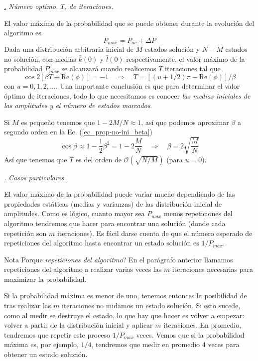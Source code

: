 \documentclass[a4paper,11pt]{book} %
\numberwithin{equation}{chapter}
\def\lc{\left[}
\def\rc{\right]}
\def\rqa{\quad \Rightarrow \quad}
\def\subsubiContadorIt{\par\addtocounter{subsubsection}{1}\underline{\it\thesubsubsection.}\hskip0.5cm \setcounter{subsubsubsectionIt}{0}}
\newcommand{\SubsubiIt}[1]{
		\subsubiContadorIt \textit{#1}
	}
\newcounter{subsubsubsectionIt}[subsubsection]
\begin{document}
\SubsubiIt{Número optimo, $T$, de iteraciones.} \label{sec_sec_subsec_prop-no-uni_T}

El valor máximo de la probabilidad que se puede obtener durante la evolución del algoritmo es
\begin{equation}
P_{max}=P_{av} + \Delta P
\end{equation}
Dada una distribución arbitraria inicial de $M$ estados solución y $N-M$ estados no solución, con medias $\bar{k}(0)$ y $\bar{l}(0)$ respectivamente, el valor máximo de la probabilidad $P_{max}$ se alcanzará cuando realicemos $T$ iteraciones tal que
\begin{equation} \label{ec_prop-no-uni_T}
\cos 2 \lc \beta T + \text{Re} (\phi) \rc = -1 \rqa 
\boxed{T = \lc (u + 1/2)  \pi - \text{Re} (\phi) \rc/\beta}
\end{equation}
con $u = 0,1,2,\dots$. Una importante conclusión es que para determinar el valor óptimo de iteraciones, todo lo que necesitamos es conocer \textit{las medias iniciales de las amplitudes y el número de estados marcados}.

Si $M$ es pequeño tenemos que $1-2M/N \approx 1$, así que podemos aproximar $\beta$ a segundo orden en la Ec. (\ref{ec_prop-no-ini_beta})
\begin{equation}
\cos \beta \approx 1 - \frac{1}{2} \beta^2 = 1- 2 \frac{M}{N} \rqa \beta = 2 \sqrt{\frac{M}{N}}
\end{equation}
Así que tenemos que $T$ es del orden de $\mathcal{O}(\sqrt{N/M})$ (para $u=0$).

\SubsubiIt{Casos particulares.} \label{sec_sec_subsec_prop-no-uni_casos-particulares}

El valor máximo de la probabilidad puede variar mucho dependiendo de las propiedades estáticas (medias y varianzas) de las distribución inicial de amplitudes. Como es lógico, cuanto mayor sea $P_{max}$ menos repeticiones del algoritmo tendremos que hacer para encontrar una solución (donde cada repetición son $m$ iteraciones). Es fácil darse cuenta de que el número esperado de repeticiones del algoritmo hasta encontrar un estado solución es $1/P_{max}$.

\begin{mybox_blue}{Nota}
Porque \textit{repeticiones del algoritmo}? En el parágrafo anterior llamamos repeticiones del algoritmo a realizar varias veces las $m$ iteraciones necesarias para maximizar la probabilidad. 
\vspace{0.3cm}

Si la probabilidad máxima es menor de uno, tenemos entonces la posibilidad de tras realizar las $m$ iteraciones no midamos un estado solución. Si esto sucede, como al medir se destruye el estado, lo que hay que hacer es volver a empezar: volver a partir de la distribución inicial y aplicar $m$ iteraciones. En promedio, tendremos que repetir este proceso $1/P_{max}$ veces. Vemos que si la probabilidad máxima es, por ejemplo, $1/4$, tendremos que medir en promedio 4 veces para obtener un estado solución. 
\end{mybox_blue}
\end{document}
